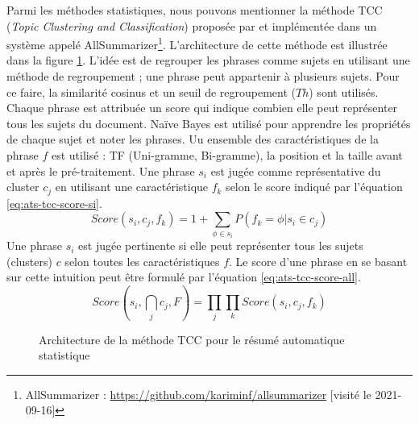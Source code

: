 \documentclass{KodeBook}
\begin{document}
Parmi les méthodes statistiques, nous pouvons mentionner la méthode TCC (\textit{Topic Clustering and Classification}) proposée par \citet{13-aries-al} et implémentée dans un système appelé AllSummarizer\footnote{AllSummarizer : \url{https://github.com/kariminf/allsummarizer} [visité le 2021-09-16]}.
L'architecture de cette méthode est illustrée dans la figure \ref{fig:ats-tcc}.
L'idée est de regrouper les phrases comme sujets en utilisant une méthode de regroupement ; une phrase peut appartenir à plusieurs sujets. 
Pour ce faire, la similarité cosinus et un seuil de regroupement ($Th$) sont utilisés.
Chaque phrase est attribuée un score qui indique combien elle peut représenter tous les sujets du document. 
Naïve Bayes est utilisé pour apprendre les propriétés de chaque sujet et noter les phrases.
%
Uu ensemble des caractéristiques de la phrase $f$ est utilisé : TF (Uni-gramme, Bi-gramme), la position et la taille avant et après le pré-traitement.
Une phrase $s_i$ est jugée comme représentative du cluster $c_j$ en utilisant une caractéristique $f_k$ selon le score indiqué par l'équation \ref{eq:ats-tcc-score-si}.
\begin{equation}\label{eq:ats-tcc-score-si}
Score(s_i , c_j , f_k ) = 1 + \sum_{\phi \in s_i} {P(f_k=\phi | s_i \in c_j)}
\end{equation}
Une phrase $s_i$ est jugée pertinente si elle peut représenter tous les sujets (clusters) $c$ selon toutes les caractéristiques $f$.
Le score d'une phrase en se basant sur cette intuition peut être formulé par l'équation \ref{eq:ats-tcc-score-all}.
\begin{equation}\label{eq:ats-tcc-score-all}
Score(s_i , \bigcap_{j} c_j , F) = \prod_{j} \prod_{k} Score(s_i , c_j , f_k )
\end{equation}

\begin{figure}[!ht]
	\centering
	\caption[Architecture de la méthode TCC (résumé automatique)]{Architecture de la méthode TCC pour le résumé automatique statistique \cite{13-aries-al}}
	\label{fig:ats-tcc}
\end{figure}
\end{document}
